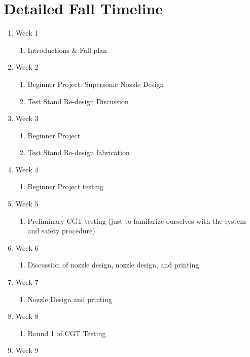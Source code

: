 \documentclass[conference]{IEEEtran} %
\begin{document}
\section{\textbf{Detailed Fall Timeline}}
\centering
\begin{enumerate}
  \item Week 1
  \begin{enumerate}
    \item Introductions \& Fall plan
  \end{enumerate}
  \item Week 2
  \begin{enumerate}
    \item Beginner Project: Supersonic Nozzle Design
    \item Test Stand Re-design Discussion
  \end{enumerate}
  \item Week 3
  \begin{enumerate}
    \item Beginner Project
    \item Test Stand Re-design fabrication
  \end{enumerate}
  \item Week 4
  \begin{enumerate}
    \item Beginner Project testing
  \end{enumerate}
  \item Week 5
  \begin{enumerate}
    \item Preliminary CGT testing (just to familarize ourselves with the system and safety procedure)
  \end{enumerate}
  \item Week 6
  \begin{enumerate}
    \item Discussion of nozzle design, nozzle design, and printing
  \end{enumerate}
  \item Week 7
  \begin{enumerate}
    \item Nozzle Design and printing
  \end{enumerate}
  \item Week 8
  \begin{enumerate}
    \item Round 1 of CGT Testing
  \end{enumerate}
  \item Week 9
  \begin{enumerate}

\end{enumerate}
\end{enumerate}
\end{document}

